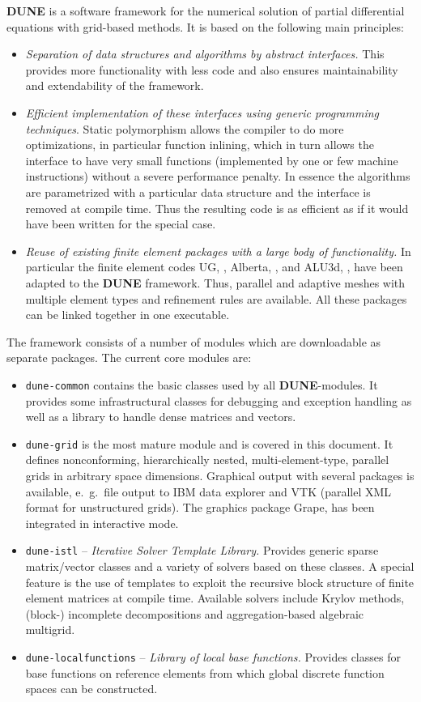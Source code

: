 \documentclass[11pt,a4paper,headinclude,footinclude,DIV16,normalheadings]{scrreprt}
\newcommand{\Dune}{{\sf\bfseries DUNE}\xspace}
\begin{document}
\Dune{} is a software framework for the numerical solution of partial
differential equations with grid-based methods. It is based on the
following main principles:
\begin{itemize}
\item \textit{Separation of data structures and
algorithms by abstract interfaces.} This provides more functionality
with less code and also ensures maintainability and
extendability of the framework.
\item \textit{Efficient implementation of these
interfaces using generic programming techniques}. Static polymorphism
allows the compiler to do more optimizations, in particular function
inlining, which in turn allows the interface to have very small
functions (implemented by one or few machine instructions) without a
severe performance penalty. In essence the algorithms are parametrized
with a particular data structure and the interface is removed at
compile time. Thus the resulting code is as efficient as if it would
have been written for the special case.
\item \textit{Reuse of existing finite element packages with a large body of
functionality.} In particular the finite element codes UG, \cite{ug},
Alberta, \cite{Alberta}, and ALU3d, \cite{ALU3d}, have been
adapted to the \Dune{} framework. Thus, parallel and adaptive meshes with
multiple element types and refinement rules are available. All these
packages can be linked together in one executable.
\end{itemize}

The framework consists of a number of modules which are downloadable
as separate packages.  The current core modules are:
\begin{itemize}
\item \texttt{dune-common} contains the basic classes used by all
  \Dune{}-modules.  It provides some infrastructural classes for
  debugging and exception handling as well as a library to handle
  dense matrices and vectors.
\item \texttt{dune-grid} is the most mature module and is covered in
  this document. It defines nonconforming, hierarchically nested,
  multi-element-type, parallel grids in arbitrary space dimensions.
  Graphical output with several packages is available, e.~g.~file
  output to IBM data explorer and VTK (parallel XML format for
  unstructured grids). The graphics package Grape, \cite{Grape} has
  been integrated in interactive mode.
\item \texttt{dune-istl} -- \textit{Iterative Solver Template
    Library.} Provides generic sparse matrix/vector classes and a
  variety of solvers based on these classes. A special feature is the
  use of templates to exploit the recursive block structure of finite
  element matrices at compile time. Available solvers include Krylov
  methods, (block-) incomplete decompositions and aggregation-based
  algebraic multigrid.
 \item \texttt{dune-localfunctions} -- \textit{Library of local base
  functions.} Provides classes for base functions on reference elements
  from which global discrete function spaces can be constructed.
\end{itemize}
\end{document}
